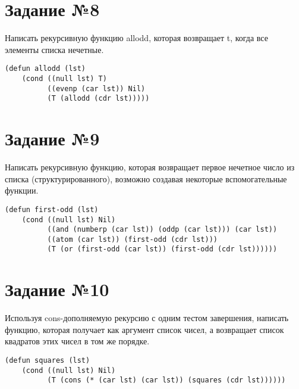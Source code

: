 \section{Задание №8}

Написать рекурсивную функцию allodd, которая возвращает t, когда все элементы
списка нечетные.

\vspace{4mm}
\begin{minipage}{0.92\linewidth}
\begin{lstlisting}
(defun allodd (lst)
    (cond ((null lst) T)
          ((evenp (car lst)) Nil)
          (T (allodd (cdr lst)))))
\end{lstlisting}
\end{minipage}

\section{Задание №9}

Написать рекурсивную функцию, которая возвращает первое нечетное число
из списка (структурированного), возможно создавая некоторые вспомогательные
функции.

\vspace{4mm}
\begin{minipage}{0.92\linewidth}
\begin{lstlisting}
(defun first-odd (lst)
    (cond ((null lst) Nil)
          ((and (numberp (car lst)) (oddp (car lst))) (car lst))
          ((atom (car lst)) (first-odd (cdr lst)))
          (T (or (first-odd (car lst)) (first-odd (cdr lst))))))
\end{lstlisting}
\end{minipage}

\section{Задание №10}

Используя cons-дополняемую рекурсию с одним тестом завершения, написать функцию,
которая получает как аргумент список чисел, а возвращает список квадратов этих
чисел в том же порядке.

\vspace{4mm}
\begin{minipage}{0.92\linewidth}
\begin{lstlisting}
(defun squares (lst)
    (cond ((null lst) Nil)
          (T (cons (* (car lst) (car lst)) (squares (cdr lst))))))
\end{lstlisting}
\end{minipage}

